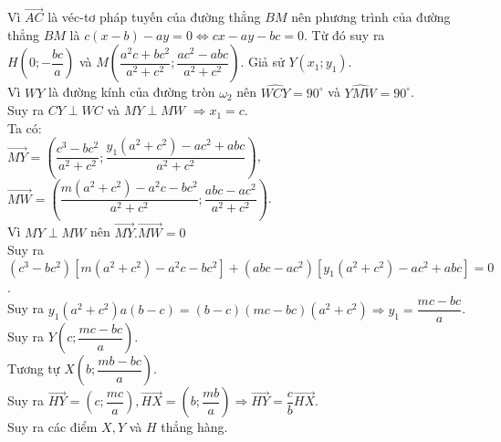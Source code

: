 \begin{bt}[IMO 2013]
{{}	
		Vì $\overrightarrow{AC}$ là véc-tơ pháp tuyến của đường thẳng $BM$ nên phương trình của đường thẳng $BM$ là $c(x-b)-ay=0 \Leftrightarrow cx-ay-bc=0$. Từ đó suy ra\\
		$H(0;-\dfrac{bc}{a})$ và $M\left(\dfrac{a^2c+bc^2}{a^2+c^2};\dfrac{ac^2-abc}{a^2+c^2}\right)$. Giả sử $Y(x_1;y_1)$.\\ Vì $WY$ là đường kính của đường tròn $\omega_2$ nên $\widehat{ WCY}=90^{\circ}$ và $\widehat{ YMW}=90^{\circ}$.\\
		Suy ra $CY\perp WC$ và $MY\perp MW$ $ \Rightarrow x_1=c$.\\
		Ta có:\\
		$\overrightarrow{MY}=\left(\dfrac{c^3-bc^2}{a^2+c^2};\dfrac{y_1(a^2+c^2)-ac^2+abc}{a^2+c^2}\right)$, $\overrightarrow{MW}=\left(\dfrac{m(a^2+c^2)-a^2c-bc^2}{a^2+c^2};\dfrac{abc-ac^2}{a^2+c^2}\right)$.\\ Vì $MY\perp MW$ nên $\overrightarrow{MY}.\overrightarrow{MW}=0$ \\
		Suy ra $(c^3-bc^2)[m(a^2+c^2)-a^2c-bc^2]+(abc-ac^2)[y_1(a^2+c^2)-ac^2+abc]=0$.\\
		Suy ra $y_1(a^2+c^2)a(b-c)=(b-c)(mc-bc)(a^2+c^2) \Rightarrow y_1=\dfrac{mc-bc}{a}$.\\
		Suy ra $Y(c;\dfrac{mc-bc}{a})$.\\
		Tương tự $X(b;\dfrac{mb-bc}{a})$.\\
		Suy ra $\overrightarrow{HY}=(c;\dfrac{mc}{a}),\overrightarrow{HX}=(b;\dfrac{mb}{a}) \Rightarrow \overrightarrow{HY}=\dfrac{c}{b}\overrightarrow{HX}$.\\
		Suy ra các điểm $X,Y$ và $H$ thẳng hàng.	
	}
\end{bt}
